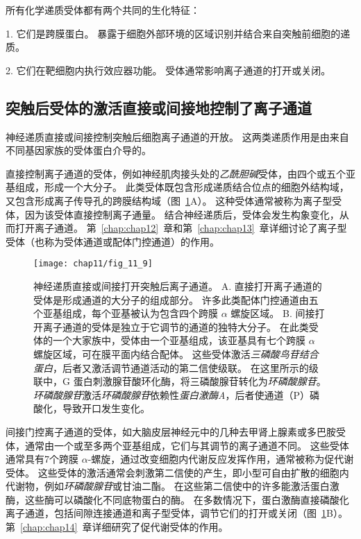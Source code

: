 所有化学递质受体都有两个共同的生化特征：

1. 它们是跨膜蛋白。
暴露于细胞外部环境的区域识别并结合来自突触前细胞的递质。


2. 它们在靶细胞内执行效应器功能。
受体通常影响离子通道的打开或关闭。



\subsection{突触后受体的激活直接或间接地控制了离子通道}

神经递质直接或间接控制突触后细胞离子通道的开放。
这两类递质作用是由来自不同基因家族的受体蛋白介导的。


直接控制离子通道的受体，例如神经肌肉接头处的\textit{乙酰胆碱}受体，由四个或五个亚基组成，形成一个大分子。
此类受体既包含形成递质结合位点的细胞外结构域，又包含形成离子传导孔的跨膜结构域（图~\ref{fig:11_9}A）。
这种受体通常被称为离子型受体，因为该受体直接控制离子通量。
结合神经递质后，受体会发生构象变化，从而打开离子通道。
第~\ref{chap:chap12}~章和第~\ref{chap:chap13}~章详细讨论了离子型受体（也称为受体通道或配体门控通道）的作用。


\begin{figure}[htbp]
	\centering
	\texttt{[image: chap11/fig\_11\_9]}
	\caption{神经递质直接或间接打开突触后离子通道。
		A. 直接打开离子通道的受体是形成通道的大分子的组成部分。
		许多此类配体门控通道由五个亚基组成，每个亚基被认为包含四个跨膜 $\alpha$ 螺旋区域。
		B. 间接打开离子通道的受体是独立于它调节的通道的独特大分子。
		在此类受体的一个大家族中，受体由一个亚基组成，该亚基具有七个跨膜 $\alpha$ 螺旋区域，可在膜平面内结合配体。
		这些受体激活\textit{三磷酸鸟苷结合蛋白}，后者又激活调节通道活动的第二信使级联。
		在这里所示的级联中，G 蛋白刺激腺苷酸环化酶，将三磷酸腺苷转化为\textit{环磷酸腺苷}。
		\textit{环磷酸腺苷}激活\textit{环磷酸腺苷}依赖性\textit{蛋白激酶A}，后者使通道（P）磷酸化，导致开口发生变化。}
	\label{fig:11_9}
\end{figure}


间接门控离子通道的受体，如大脑皮层神经元中的几种去甲肾上腺素或多巴胺受体，通常由一个或至多两个亚基组成，它们与其调节的离子通道不同。
这些受体通常具有7个跨膜 $\alpha$-螺旋，通过改变细胞内代谢反应发挥作用，通常被称为促代谢受体。
这些受体的激活通常会刺激第二信使的产生，即小型可自由扩散的细胞内代谢物，例如\textit{环磷酸腺苷}或甘油二酯。
在这些第二信使中的许多能激活蛋白激酶，这些酶可以磷酸化不同底物蛋白的酶。
在多数情况下，蛋白激酶直接磷酸化离子通道，包括间隙连接通道和离子型受体，调节它们的打开或关闭（图~\ref{fig:11_9}B）。 
第~\ref{chap:chap14}~章详细研究了促代谢受体的作用。


